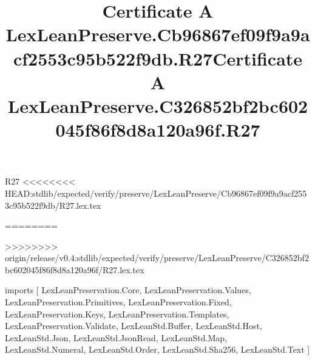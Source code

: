 \begin{lexlean}{R27}
<<<<<<<< HEAD:stdlib/expected/verify/preserve/LexLeanPreserve/Cb96867ef09f9a9acf2553c95b522f9db/R27.lex.tex
\title{Certificate A LexLeanPreserve.Cb96867ef09f9a9acf2553c95b522f9db.R27}
========
\title{Certificate A LexLeanPreserve.C326852bf2bc602045f86f8d8a120a96f.R27}
>>>>>>>> origin/release/v0.4:stdlib/expected/verify/preserve/LexLeanPreserve/C326852bf2bc602045f86f8d8a120a96f/R27.lex.tex
\begin{coremodule}
imports [
  LexLeanPreservation.Core,
  LexLeanPreservation.Values,
  LexLeanPreservation.Primitives,
  LexLeanPreservation.Fixed,
  LexLeanPreservation.Keys,
  LexLeanPreservation.Templates,
  LexLeanPreservation.Validate,
  LexLeanStd.Buffer,
  LexLeanStd.Host,
  LexLeanStd.Json,
  LexLeanStd.JsonRead,
  LexLeanStd.Map,
  LexLeanStd.Numeral,
  LexLeanStd.Order,
  LexLeanStd.Sha256,
  LexLeanStd.Text
]


\end{coremodule}
\end{lexlean}
